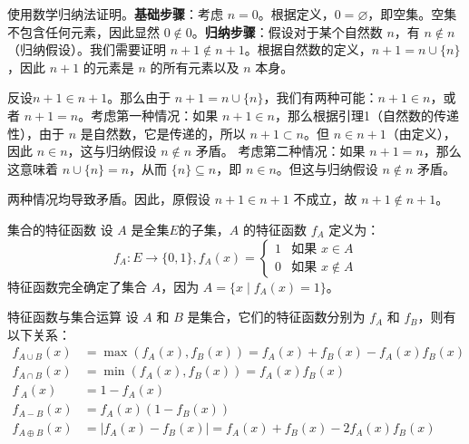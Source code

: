 \documentclass[lang=cn,11pt]{elegantbook}
\begin{document}
使用数学归纳法证明。\textbf{基础步骤}：考虑 $n = 0$。根据定义，$0 = \varnothing$，即空集。空集不包含任何元素，因此显然 $0 \notin 0$。\textbf{归纳步骤}：假设对于某个自然数 $n$，有 $n \notin n$（归纳假设）。我们需要证明 $n+1 \notin n+1$。根据自然数的定义，$n+1 = n \cup \{n\}$，因此 $n+1$ 的元素是 $n$ 的所有元素以及 $n$ 本身。

反设$n+1 \in n+1$。那么由于 $n+1 = n \cup \{n\}$，我们有两种可能：$n+1 \in n$，或者 $n+1 = n$。考虑第一种情况：如果 $n+1 \in n$，那么根据引理1（自然数的传递性），由于 $n$ 是自然数，它是传递的，所以 $n+1 \subset n$。但 $n \in n+1$（由定义），因此 $n \in n$，这与归纳假设 $n \notin n$ 矛盾。
考虑第二种情况：如果 $n+1 = n$，那么这意味着 $n \cup \{n\} = n$，从而 $\{n\} \subseteq n$，即 $n \in n$。但这与归纳假设 $n \notin n$ 矛盾。

两种情况均导致矛盾。因此，原假设 $n+1 \in n+1$ 不成立，故 $n+1 \notin n+1$。
\begin{definition}{集合的特征函数}
设 $A$ 是全集$E$的子集，$A$ 的特征函数 $f_A$ 定义为：
\[
f_A:E\to\{0,1\},f_A(x) = 
\begin{cases}
1 & \text{如果 } x \in A \\
0 & \text{如果 } x \notin A
\end{cases}
\]
特征函数完全确定了集合 $A$，因为 $A = \{x \mid f_A(x) = 1\}$。
\end{definition}
\begin{theorem}{特征函数与集合运算}
设 $A$ 和 $B$ 是集合，它们的特征函数分别为 $f_A$ 和 $f_B$，则有以下关系：\vspace{-5pt}
\begin{align*}
f_{A \cup B}(x) &= \max(f_A(x), f_B(x)) = f_A(x) + f_B(x) - f_A(x)f_B(x) \\
f_{A \cap B}(x) &= \min(f_A(x), f_B(x)) = f_A(x)f_B(x) \\
f_{~A}(x) &= 1 - f_A(x) \\
f_{A -B}(x) &= f_A(x)(1 - f_B(x)) \\
f_{A \oplus B}(x) &= |f_A(x) - f_B(x)| = f_A(x) + f_B(x) - 2f_A(x)f_B(x)
\end{align*}
\end{theorem}
\end{document}
